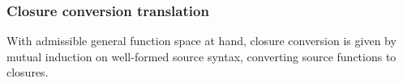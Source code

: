 \documentclass[a4paper]{easychair}
\begin{document}
\subsubsection*{Closure conversion translation}

With admissible general function space at hand, closure conversion is given
by mutual induction on well-formed source syntax, converting source functions to closures.


\end{document}
